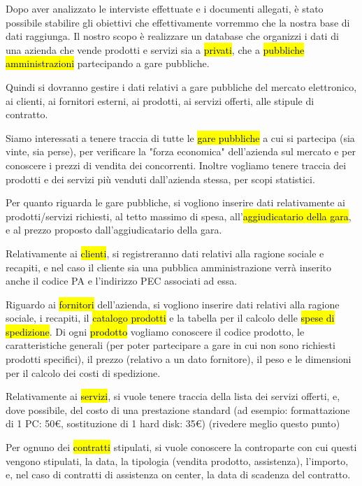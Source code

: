 
Dopo aver analizzato le interviste effettuate e i documenti allegati, è stato possibile stabilire gli obiettivi che effettivamente vorremmo che la nostra base di dati raggiunga.
Il nostro scopo è realizzare un database che organizzi i dati di una azienda che vende prodotti e servizi sia a \hl{privati}, che a \hl{pubbliche amministrazioni} partecipando a gare pubbliche.


\noindent
\newline
Quindi si dovranno gestire i dati relativi a gare pubbliche del mercato elettronico, ai clienti, ai fornitori esterni, ai prodotti, ai servizi offerti, alle stipule di contratto.

\noindent
\newline
Siamo interessati a tenere traccia di tutte le \hl{gare pubbliche} a cui si partecipa (sia vinte, sia perse), per verificare la "forza economica" dell'azienda sul mercato e per conoscere i prezzi di vendita dei concorrenti.
Inoltre vogliamo tenere traccia dei prodotti e dei servizi più venduti dall'azienda stessa, per scopi statistici.

\noindent
\newline
Per quanto riguarda le gare pubbliche, si vogliono inserire dati relativamente ai prodotti/servizi richiesti, al tetto massimo di spesa, all'\hl{aggiudicatario della gara}, e al prezzo proposto dall'aggiudicatario della gara.

\noindent
\newline
Relativamente ai \hl{clienti}, si registreranno dati relativi alla ragione sociale e recapiti, e nel caso il cliente sia una pubblica amministrazione verrà inserito anche il codice PA e l'indirizzo PEC associati ad essa.

\noindent
\newline
Riguardo ai \hl{fornitori} dell'azienda, si vogliono inserire dati relativi alla ragione sociale, i recapiti, il \hl{catalogo prodotti} e la tabella per il calcolo delle \hl{spese di spedizione}.
Di ogni \hl{prodotto} vogliamo conoscere il codice prodotto, le caratteristiche generali (per poter partecipare a gare in cui non sono richiesti prodotti specifici), il prezzo (relativo a un dato fornitore), il peso e le dimensioni per il calcolo dei costi di spedizione.

\noindent
\newline
Relativamente ai \hl{servizi}, si vuole tenere traccia della lista dei servizi offerti, e, dove possibile, del costo di una prestazione standard (ad esempio: formattazione di 1 PC: 50€, sostituzione di 1 hard disk: 35€) (rivedere meglio questo punto)

\noindent
\newline
Per ognuno dei \hl{contratti} stipulati, si vuole conoscere la controparte con cui questi vengono stipulati, la data, la tipologia (vendita prodotto, assistenza), l'importo, e, nel caso di contratti di assistenza on center, la data di scadenza del contratto.

\newpage
